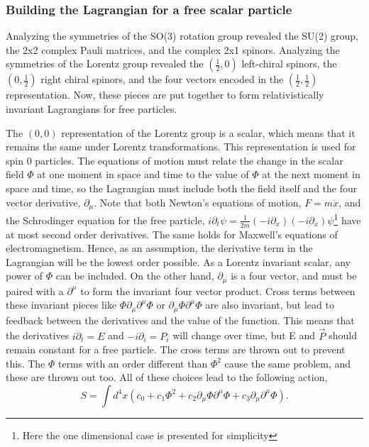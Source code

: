\subsubsection{Building the Lagrangian for a free scalar particle}

Analyzing the symmetries of the SO(3) rotation group revealed the SU(2) group, the 2x2 complex Pauli matrices, and the complex 2x1 spinors. Analyzing the symmetries of the Lorentz group revealed the $(\frac{1}{2}, 0)$ left-chiral spinors, the $(0, \frac{1}{2})$ right chiral spinors, and the four vectors encoded in the $(\frac{1}{2}, \frac{1}{2})$ representation. Now, these pieces are put together to form relativistically invariant Lagrangians for free particles.  

The $(0,0)$ representation of the Lorentz group is a scalar, which means that it remains the same under Lorentz transformations. This representation is used for spin 0 particles. The equations of motion must relate the change in the scalar field $\Phi$ at one moment in space and time to the value of $\Phi$ at the next moment in space and time, so the Lagrangian must include both the field itself and the four vector derivative, $\partial_\mu$. Note that both Newton's equations of motion, $F=m\ddot{x}$, and the Schrodinger equation for the free particle, $i\partial_t\psi = \frac{1}{2m}(-i\partial_x)(-i\partial_x)\psi$\footnote{Here the one dimensional case is presented for simplicity} have at most second order derivatives. The same holds for Maxwell's equations of electromagnetism. Hence, as an assumption, the derivative term in the Lagrangian will be the lowest order possible. As a Lorentz invariant scalar, any power of $\Phi$ can be included. On the other hand, $\partial_\mu$ is a four vector, and must be paired with a $\partial^\mu$ to form the invariant four vector product. Cross terms between these invariant pieces like $\Phi\partial_\mu\partial^\mu\Phi$ or $\partial_\mu\Phi\partial^\mu\Phi$ are also invariant, but lead to feedback between the derivatives and the value of the function. This means that the derivatives $i\partial_t = E$ and $-i\partial_i = P_i$ will change over time, but E and $\vec{P}$ should remain constant for a free particle. The cross terms are thrown out to prevent this. The $\Phi$ terms with an order different than $\Phi^2$ cause the same problem, and these are thrown out too. All of these choices lead to the following action, 
\begin{equation}
S = \int d^4x \left(c_0 + c_1 \Phi^2  
+ c_2 \partial_\mu\Phi\partial^\mu\Phi + c_3 \partial_\mu \partial^\mu \Phi\right).
\end{equation}

